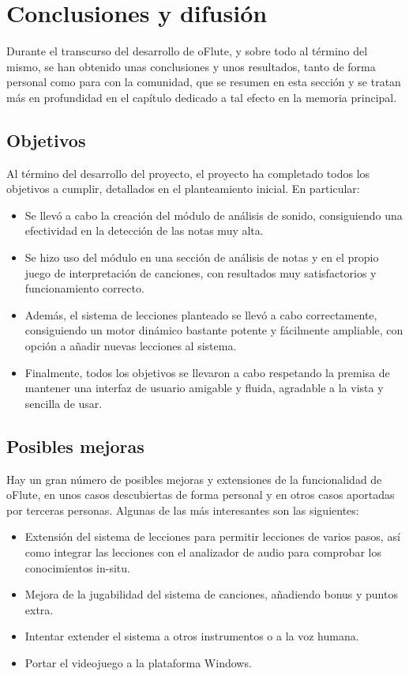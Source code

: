 \documentclass[a4paper,11pt]{article}
\begin{document}
\section{Conclusiones y difusión}
Durante el transcurso del desarrollo de oFlute, y sobre todo al término del
mismo, se han obtenido unas conclusiones y unos resultados, tanto de forma
personal como para con la comunidad, que se resumen en esta sección y se tratan
más en profundidad en el capítulo dedicado a tal efecto en la memoria principal.

\subsection{Objetivos}
Al término del desarrollo del proyecto, el proyecto ha completado todos los
objetivos a cumplir, detallados en el planteamiento inicial. En particular:

\begin{itemize}
\item Se llevó a cabo la creación del módulo de análisis de sonido, consiguiendo
  una efectividad en la detección de las notas muy alta.
\item Se hizo uso del módulo en una sección de análisis de notas y en el propio
  juego de interpretación de canciones, con resultados muy satisfactorios y
  funcionamiento correcto.
\item Además, el sistema de lecciones planteado se llevó a cabo correctamente,
  consiguiendo un motor dinámico bastante potente y fácilmente ampliable, con
  opción a añadir nuevas lecciones al sistema.
\item Finalmente, todos los objetivos se llevaron a cabo respetando la premisa
  de mantener una interfaz de usuario amigable y fluida, agradable a la vista y
  sencilla de usar.
\end{itemize}

\subsection{Posibles mejoras}
Hay un gran número de posibles mejoras y extensiones de la funcionalidad de
oFlute, en unos casos descubiertas de forma personal y en otros casos aportadas
por terceras personas. Algunas de las más interesantes son las siguientes:
\begin{itemize}
\item Extensión del sistema de lecciones para permitir lecciones de varios
  pasos, así como integrar las lecciones con el analizador de audio para
  comprobar los conocimientos in-situ.
\item Mejora de la jugabilidad del sistema de canciones, añadiendo bonus y
  puntos extra.
\item Intentar extender el sistema a otros instrumentos o a la voz humana.
\item Portar el videojuego a la plataforma Windows.
\end{itemize}
\end{document}
